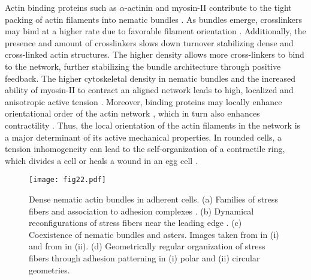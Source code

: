 Actin binding proteins such as $\alpha$-actinin  and myosin-II contribute to the tight packing of actin filaments into nematic bundles \cite{blanchoin2014,winkelman2016,lehtimaki2021, laporte2012}. As bundles emerge,  crosslinkers may bind at a higher rate due to favorable filament orientation  \cite{courson2010}. Additionally, the presence  and amount of crosslinkers slows down turnover \cite{SCHMOLLER2011350}  stabilizing dense and cross-linked actin structures. The higher density allows more cross-linkers to bind to the network,  further stabilizing the bundle architecture through positive feedback. The higher cytoskeletal density in nematic bundles and the increased ability of myosin-II to contract an aligned network leads to high, localized and anisotropic active tension \cite{bergert2015, turlier2014, mayer2010, kelkar2020}. Moreover, binding proteins may locally enhance  orientational order of the actin network  \cite{lehtimaki2021}, which in turn also enhances  contractility \cite{kelkar2020}. Thus, the local orientation of the actin filaments in the network is a major determinant of its active mechanical properties. In rounded cells, a tension inhomogeneity  can lead to the self-organization of a contractile  ring, which divides a cell \cite{greenspan1978, mietke2019_2, mietke2019, koyama2012,gladilin2015,biron2005,turlier2014,sain2015,zhao2016,akkacs1980,poirier2012} or heals a wound in an egg cell \cite{mandato2001}.


\begin{figure}
	\centering
	\texttt{[image: fig22.pdf]}
	\caption{\label{chap_1_fig_22} Dense nematic actin bundles in adherent cells. (a) Families of stress fibers and association to adhesion complexes \cite{hotulainen2006}. (b) Dynamical reconfigurations of stress fibers near the leading edge \cite{tojkander2015}. (c) Coexistence of nematic bundles and asters. Images taken from  \cite{jalal2019} in (i) and  from \cite{xia2019} in (ii). (d) Geometrically regular organization of stress fibers through adhesion patterning in (i) polar \cite{10.1242/jcs.236604} and (ii) circular \cite{jalal2019} geometries. }
\end{figure}



